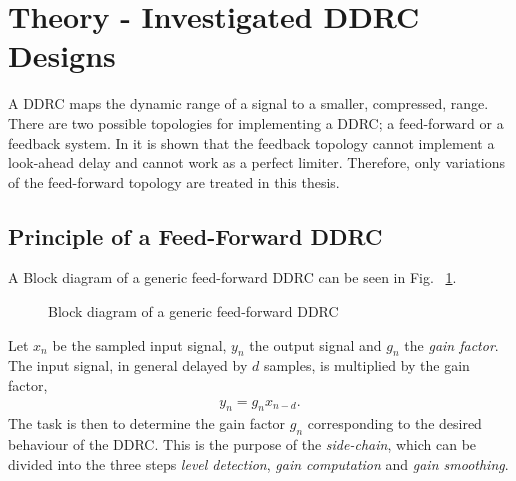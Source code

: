 \documentclass[../main2.tex]{subfiles}
\providecommand{\rootdir}{..}
\begin{document}
\FloatBarrier
\section{Theory - Investigated DDRC Designs} \label{theory_DDRC}
A DDRC maps the dynamic range of a signal to a smaller, compressed, range. There are two possible topologies for implementing a DDRC; a feed-forward or a feedback system. In \cite{reiss2012tutorial} it is shown that the feedback topology cannot implement a look-ahead delay and cannot work as a perfect limiter. Therefore, only variations of the feed-forward topology are treated in this thesis. 

\subsection{Principle of a Feed-Forward DDRC}
A Block diagram of a generic feed-forward DDRC can be seen in Fig. ~\ref{fig:block_genericDDRC}.
\begin{figure}[h]
\centerline{}
\caption{Block diagram of a generic feed-forward DDRC}
\label{fig:block_genericDDRC}
\end{figure}

Let $x_n$ be the sampled input signal, $y_n$ the output signal and $g_n$ the \emph{gain factor}. The input signal, in general delayed by $d$ samples, is multiplied by the gain factor,
\begin{align}
y_n = g_nx_{n-d}.
\label{eq:gainfactor}
\end{align}
The task is then to determine the gain factor $g_n$ corresponding to the desired behaviour of the DDRC. This is the purpose of the \emph{side-chain}, which can be divided into the three steps \emph{level detection}, \emph{gain computation} and \emph{gain smoothing}.






\end{document}
